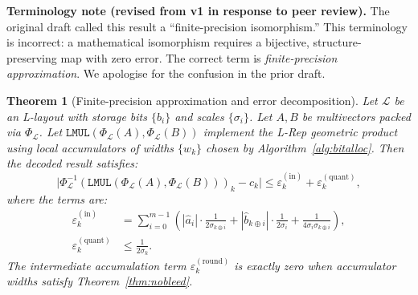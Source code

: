 \documentclass[11pt,a4paper]{article}
\theoremstyle{definition}
\theoremstyle{plain}
\newtheorem{theorem}{Theorem}[section]
\theoremstyle{remark}
\newcommand{\Pack}{\Phi_{\mathcal{L}}}
\newcommand{\Unpack}{\Phi^{-1}_{\mathcal{L}}}
\begin{document}
\begin{warningbox}
\textbf{Terminology note (revised from v1 in response to peer review).}
The original draft called this result a ``finite-precision isomorphism.''
This terminology is incorrect: a mathematical isomorphism requires a
bijective, structure-preserving map with zero error.
The correct term is \emph{finite-precision approximation}.
We apologise for the confusion in the prior draft.
\end{warningbox}

\begin{theorem}[Finite-precision approximation and error decomposition]
\label{thm:finite-approx}
Let $\mathcal{L}$ be an L-layout with storage bits $\{b_i\}$ and
scales $\{\sigma_i\}$.
Let $A, B$ be multivectors packed via $\Pack$.
Let $\mathtt{LMUL}(\Pack(A), \Pack(B))$ implement the L-Rep geometric
product using local accumulators of widths $\{w_k\}$ chosen by
Algorithm~\ref{alg:bitalloc}.
Then the decoded result satisfies:
\begin{equation}\label{eq:error-main}
  \bigl|\Unpack(\mathtt{LMUL}(\Pack(A),\Pack(B)))_k - c_k\bigr|
  \le \varepsilon_k^{(\mathrm{in})} + \varepsilon_k^{(\mathrm{quant})},
\end{equation}
where the terms are:
\begin{align}
  \varepsilon_k^{(\mathrm{in})}
    &= \sum_{i=0}^{m-1}\!
      \left(|\hat{a}_i| \cdot \frac{1}{2\sigma_{k\oplus i}}
        + |\hat{b}_{k\oplus i}| \cdot \frac{1}{2\sigma_i}
        + \frac{1}{4\sigma_i \sigma_{k\oplus i}}\right),
      \label{eq:eps-in}\\
  \varepsilon_k^{(\mathrm{quant})}
    &\le \frac{1}{2\sigma_k}.
      \label{eq:eps-quant}
\end{align}
The intermediate accumulation term $\varepsilon_k^{(\mathrm{round})}$ is
\emph{exactly zero} when accumulator widths satisfy
Theorem~\ref{thm:nobleed}.
\end{theorem}
\end{document}
